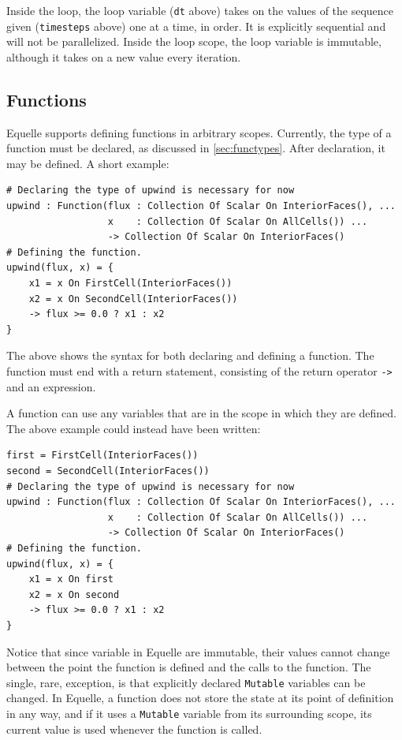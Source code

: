 \documentclass[11pt]{article}
\newcommand{\code}[1]{\texttt{#1}}
\begin{document}
Inside the loop, the loop variable (\code{dt} above) takes on the values of the sequence
given (\code{timesteps} above) one at a time, in order. It is explicitly sequential and
will not be parallelized. Inside the loop scope, the loop variable is immutable, although
it takes on a new value every iteration.

\subsection{Functions}

Equelle supports defining functions in arbitrary scopes. Currently, the type of a function
must be declared, as discussed in \ref{sec:functypes}. After declaration, it may be
defined. A short example:

\begin{verbatim}
# Declaring the type of upwind is necessary for now
upwind : Function(flux : Collection Of Scalar On InteriorFaces(), ...
                  x    : Collection Of Scalar On AllCells()) ...
                  -> Collection Of Scalar On InteriorFaces()
# Defining the function.
upwind(flux, x) = {
    x1 = x On FirstCell(InteriorFaces())
    x2 = x On SecondCell(InteriorFaces())
    -> flux >= 0.0 ? x1 : x2
}
\end{verbatim}

The above shows the syntax for both declaring and defining a function. The function must
end with a return statement, consisting of the return operator \code{->} and an
expression.

A function can use any variables that are in the scope in which they are defined. The
above example could instead have been written:

\begin{verbatim}
first = FirstCell(InteriorFaces())
second = SecondCell(InteriorFaces())
# Declaring the type of upwind is necessary for now
upwind : Function(flux : Collection Of Scalar On InteriorFaces(), ...
                  x    : Collection Of Scalar On AllCells()) ...
                  -> Collection Of Scalar On InteriorFaces()
# Defining the function.
upwind(flux, x) = {
    x1 = x On first
    x2 = x On second
    -> flux >= 0.0 ? x1 : x2
}
\end{verbatim}

Notice that since variable in Equelle are immutable, their values cannot change between
the point the function is defined and the calls to the function. The single, rare, exception,
is that explicitly declared \code{Mutable} variables can be changed. In Equelle, a
function does not store the state at its point of definition in any way, and if it uses a
\code{Mutable} variable from its surrounding scope, its current value is used whenever the
function is called.
\end{document}
